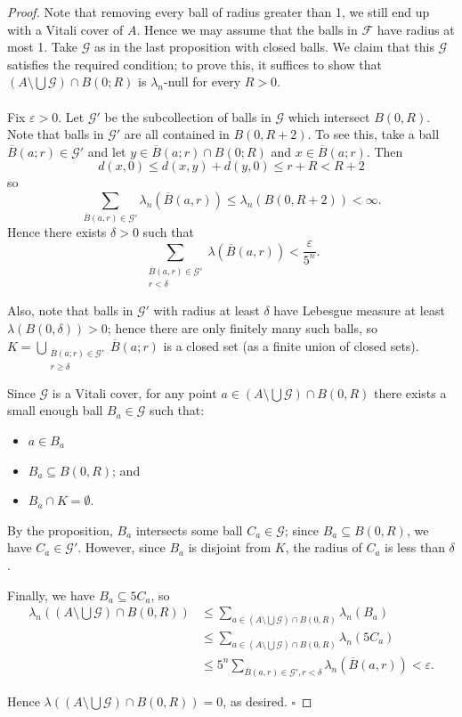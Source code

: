\documentclass{article}
\theoremstyle{plain}
\theoremstyle{definition}
\theoremstyle{remark}
\begin{document}
\begin{proof}
    Note that removing every ball of radius greater than 1, we still end up with a Vitali cover of $A$. Hence we may assume that the balls in $\mathcal{F}$ have radius at most 1. Take $\mathcal{G}$ as in the last proposition with closed balls. We claim that this $\mathcal{G}$ satisfies the required condition; to prove this, it suffices to show that $\left (A \setminus \bigcup \mathcal{G} \right ) \cap B(0;R)$ is $\lambda _n$-null for every $R>0$. \\ ~\\ 
    Fix $\varepsilon > 0$. Let $\mathcal{G}'$ be the subcollection of balls in $\mathcal{G}$ which intersect $B(0, R)$.
Note that balls in $\mathcal{G}'$ are all contained in $B(0, R + 2)$. To see this, take a ball $\overline{B}(a;r) \in \mathcal{G}'$ and let $y \in \overline{B}(a;r) \cap B(0;R)$ and $x \in \overline{B}(a;r)$. Then \[
d(x,0) \le d(x,y) + d(y,0) \le r+R < R+2
\]
so
\[
\sum_{\overline{B}(a,r) \in \mathcal{G}'} \lambda_n(\overline{B}(a, r)) \leq \lambda_n(B(0, R + 2)) < \infty.
\]
Hence there exists $\delta>0$ such that
\[
\sum_{\substack{\overline{B}(a,r) \in \mathcal{G}' \\ r < \delta}} \lambda(\overline{B}(a, r)) < \frac{\varepsilon}{5^n}.
\]

Also, note that balls in $\mathcal{G}'$ with radius at least $\delta$ have Lebesgue measure at least $\lambda(B(0, \delta)) > 0$; hence there are only finitely many such balls, so $K = \bigcup \limits _{{\substack{\overline{B}(a;r) \in \mathcal{G}' \\ r \ge \delta}}} \overline{B}(a;r)$ is a closed set (as a finite union of closed sets).

Since $\mathcal{G}$ is a Vitali cover, for any point $a \in (A \setminus \bigcup \mathcal{G}) \cap B(0, R)$ there exists a small enough ball $B_a \in \mathcal{G}$ such that:
\begin{itemize}
\item $a \in B_a$ %
\item $B_a \subseteq B(0, R)$; and
\item $B_a \cap K = \emptyset$.
\end{itemize}
By the proposition, $B_a$ intersects some ball $C_a \in \mathcal{G}$; since $B_a \subseteq B(0, R)$, we have $C_a \in \mathcal{G}'$. However, since $B_a$ is disjoint from $K$, the radius of $C_a$ is less than $\delta$.

Finally, we have $B_a \subseteq 5C_a$, so
\begin{align*}
\lambda_n\left((A \setminus \bigcup \mathcal{G}) \cap B(0, R)\right) &\leq \sum_{a \in (A \setminus \bigcup \mathcal{G}) \cap B(0, R)} \lambda_n(B_a) \\
&\leq \sum_{a \in (A \setminus \bigcup \mathcal{G}) \cap B(0, R)} \lambda_n(5C_a) \\
&\leq 5^n \sum_{\overline{B}(a,r) \in \mathcal{G}', r < \delta} \lambda_n(\overline{B}(a, r)) < \varepsilon.
\end{align*}

Hence $\lambda\left((A \setminus \bigcup \mathcal{G}) \cap B(0, R)\right) = 0$, as desired. $\square$
\end{proof}
\end{document}

